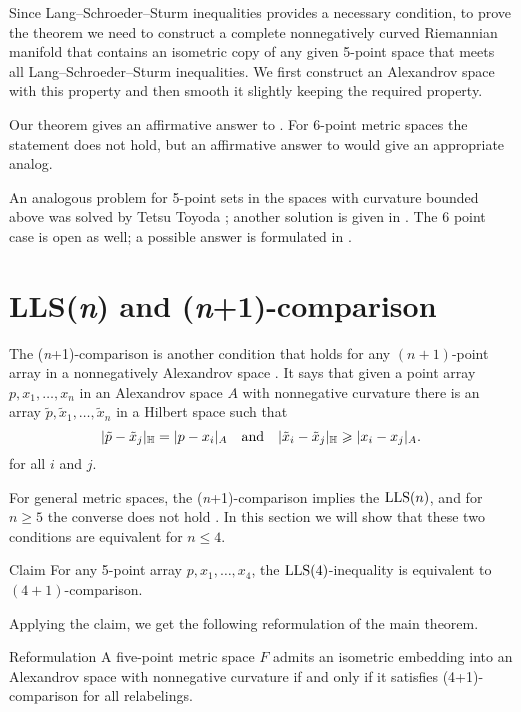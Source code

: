\documentclass{article}
\begin{document}
Since Lang--Schroeder--Sturm inequalities provides a necessary condition,
to prove the theorem we need to construct a complete nonnegatively curved Riemannian manifold that contains an isometric copy of any given 5-point space that meets all Lang--Schroeder--Sturm inequalities.
We first construct an Alexandrov space with this property and then smooth it slightly keeping the required property.

Our theorem gives an affirmative answer to \cite[Question. 6.2]{lebedeva-petrunin}.
For 6-point metric spaces the statement does not hold, but an affirmative answer to \cite[Question 6.3]{lebedeva-petrunin} would give an appropriate analog.

An analogous problem for 5-point sets in the spaces with curvature bounded above was solved by Tetsu Toyoda \cite{toyoda}; another solution is given in \cite{lebedeva-petrunin}.
The 6 point case is open as well; a possible answer is formulated in \cite[Question 6.1]{lebedeva-petrunin}.

\section{LLS(\textit{n}) and (\textit{n}+1)-comparison}

The (\textit{n}+1)-comparison is another condition that holds for any $(n+1)$-point array in a nonnegatively Alexandrov space \cite{alexander2019alexandrov}.
It says that given a point array $p,x_1,\dots,x_n$ in an Alexandrov space $A$ with nonnegative curvature
there is an array $\tilde p,\tilde x_1,\dots,\tilde x_n$ in a Hilbert space such that 
\[
|\tilde p-\tilde x_j|_{\mathbb H}=|p-x_i|_{A}
\quad
\text{and}
\quad
|\tilde x_i-\tilde x_j|_{\mathbb H}\geqslant |x_i-x_j|_{A}.
\]
for all $i$ and $j$.

For general metric spaces, the (\textit{n}+1)-comparison implies the $\mathrm{LLS}(n)$,
and for $n\ge 5$ the converse does not hold \cite[Section 8]{lebedeva-petrunin-zolotov}.
In this section we will show that these two conditions are equivalent for $n\le 4$.

\begin{thm}{Claim}\label{clm:(4+1)=LSS(4)}
For any 5-point array $p,x_1,\dots,x_4$, the
$\mathrm{LLS}(4)$-inequality is equivalent to $(4+1)$-comparison.
\end{thm}

Applying the claim, we get the following reformulation of the main theorem.

\begin{thm}{Reformulation}\label{thm:main-(4+1)}
A five-point metric space $F$ admits an isometric embedding into an Alexandrov space with nonnegative curvature
if and only if it satisfies (4+1)-comparison for all relabelings.
\end{thm}
\end{document}

